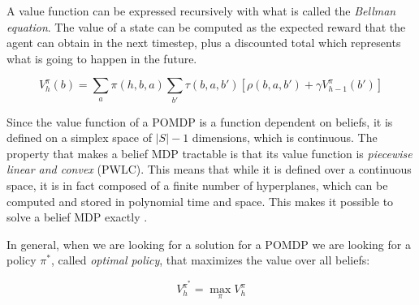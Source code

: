 A value function can be expressed recursively with what is called the \textit{Bellman equation}.
The value of a state can be computed as the expected reward that the agent can obtain in the
next timestep, plus a discounted total which represents what is going to happen in the future.

\[ V^{\pi}_{h}(b) = \sum_a \pi(h, b, a) \sum_{b'} \tau(b, a, b') \left [ \rho(b, a, b') + \gamma
V^{\pi}_{h-1}(b') \right ] \]

Since the value function of a POMDP is a function dependent on beliefs, it is defined on a simplex
space of $|S|-1$ dimensions, which is continuous. The property that makes a belief MDP tractable is
that its value function is \textit{piecewise linear and convex} (PWLC). This means that while it is
defined over a continuous space, it is in fact composed of a finite number of hyperplanes, which can
be computed and stored in polynomial time and space. This makes it possible to solve a belief MDP
exactly \cite{cit:pomdp}.

In general, when we are looking for a solution for a POMDP we are looking for a policy $\pi^*$, called
\textit{optimal policy}, that maximizes the value over all beliefs:

\[ V^{\pi^*}_h = \max_\pi V^{\pi}_h \]

%
%
%
%
%

